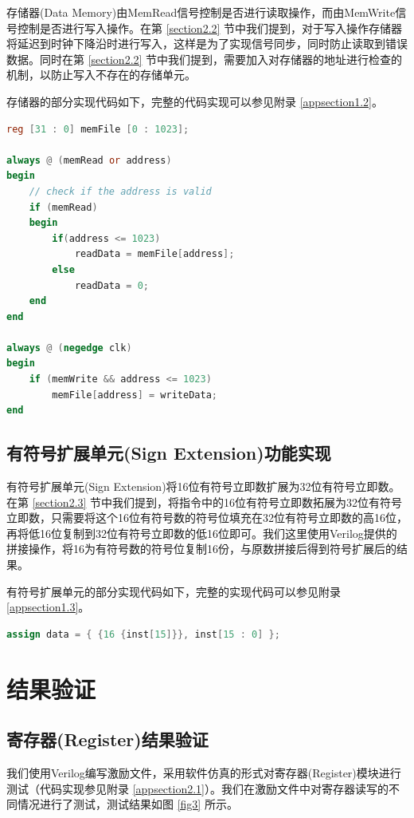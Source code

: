 \documentclass{cumcm}
\numberwithin{equation}{section}
\numberwithin{equation}{subsection}
\begin{document}
存储器(Data Memory)由MemRead信号控制是否进行读取操作，而由MemWrite信号控制是否进行写入操作。在第 \ref{section2.2} 节中我们提到，对于写入操作存储器将延迟到时钟下降沿时进行写入，这样是为了实现信号同步，同时防止读取到错误数据。同时在第 \ref{section2.2} 节中我们提到，需要加入对存储器的地址进行检查的机制，以防止写入不存在的存储单元。

存储器的部分实现代码如下，完整的代码实现可以参见附录 \ref{appsection1.2}。
\begin{lstlisting}[language=verilog]
reg [31 : 0] memFile [0 : 1023];

always @ (memRead or address)
begin
    // check if the address is valid
    if (memRead)
    begin
        if(address <= 1023)
            readData = memFile[address];
        else
            readData = 0;
    end
end
    
always @ (negedge clk)
begin
    if (memWrite && address <= 1023)
        memFile[address] = writeData;
end
\end{lstlisting}

\subsection{有符号扩展单元(Sign Extension)功能实现}\label{section3.3}

有符号扩展单元(Sign Extension)将16位有符号立即数扩展为32位有符号立即数。在第 \ref{section2.3} 节中我们提到，将指令中的16位有符号立即数拓展为32位有符号立即数，只需要将这个16位有符号数的符号位填充在32位有符号立即数的高16位，再将低16位复制到32位有符号立即数的低16位即可。我们这里使用Verilog提供的拼接操作，将16为有符号数的符号位复制16份，与原数拼接后得到符号扩展后的结果。

有符号扩展单元的部分实现代码如下，完整的实现代码可以参见附录 \ref{appsection1.3}。

\begin{lstlisting}[language=verilog]
assign data = { {16 {inst[15]}}, inst[15 : 0] };
\end{lstlisting}


\section{结果验证}\label{section4}

\subsection{寄存器(Register)结果验证}\label{section4.1}

我们使用Verilog编写激励文件，采用软件仿真的形式对寄存器(Register)模块进行测试（代码实现参见附录 \ref{appsection2.1}）。我们在激励文件中对寄存器读写的不同情况进行了测试，测试结果如图 \ref{fig3} 所示。
\end{document}
